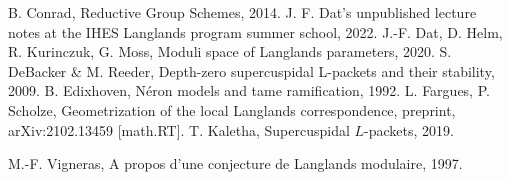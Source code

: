 \documentclass{article}
\begin{document}
	\footnotesize
	\begin{thebibliography}{99}
		 B. Conrad, Reductive Group Schemes, 2014.
		 J. F. Dat's unpublished lecture notes at the IHES Langlands program summer school, 2022.
		 J.-F. Dat, D. Helm, R. Kurinczuk, G. Moss, Moduli space of Langlands parameters, 2020.
		 S. DeBacker \& M. Reeder, Depth-zero supercuspidal L-packets and their stability, 2009.
		 B. Edixhoven, Néron models and tame ramification, 1992.
		 L. Fargues, P. Scholze, Geometrization of the local Langlands correspondence, preprint,
		arXiv:2102.13459 [math.RT].
		 T. Kaletha, Supercuspidal $L$-packets, 2019.
		
		 M.-F. Vigneras, A propos d'une conjecture de Langlands modulaire, 1997.
		
		
		
		
		
		
	\end{thebibliography}
	
	
	
\end{document}
